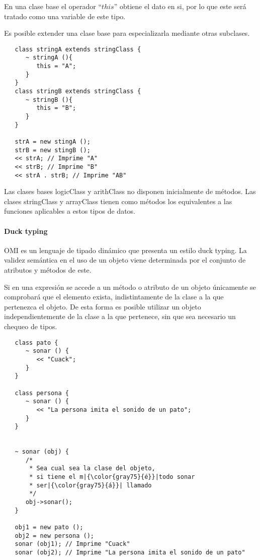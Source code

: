  En una clase base el operador ``$this$'' obtiene el dato en si, por lo que este será tratado como una variable
 de este tipo.
 
 Es posible extender una clase base para especializarla mediante otras subclases. \\
 
 \begin{lstlisting}
   class stringA extends stringClass {
      ~ stringA (){
         this = "A";
      }
   }
   class stringB extends stringClass {
      ~ stringB (){
         this = "B";
      }
   }

   strA = new stingA ();
   strB = new stingB ();
   << strA; // Imprime "A"
   << strB; // Imprime "B"
   << strA . strB; // Imprime "AB"
\end{lstlisting}

Las clases bases logicClass y arithClass no disponen inicialmente de métodos.
Las clases stringClass y arrayClass tienen como métodos los equivalentes 
a las funciones aplicables a estos tipos de datos.

\paragraph{Duck typing}

OMI es un lenguaje de tipado dinámico que presenta un estilo duck typing.
La validez semántica en el uso de un objeto viene determinada
por el conjunto de atributos y métodos de este. 

Si en una expresión se accede a un método o atributo de un objeto únicamente se
comprobará que el elemento exista, indistintamente de la clase a la que pertenezca 
el objeto. De esta forma es posible utilizar un objeto independientemente de 
la clase a la que pertenece, sin que sea necesario un chequeo de tipos. \\

\begin{lstlisting}
   class pato {
      ~ sonar () {
         << "Cuack";
      }
   }

   class persona {
      ~ sonar () {
         << "La persona imita el sonido de un pato";
      }
   }


   ~ sonar (obj) {
      /*
       * Sea cual sea la clase del objeto, 
       * si tiene el m|{\color{gray75}{é}}|todo sonar
       * ser|{\color{gray75}{á}}| llamado
       */
      obj->sonar();
   }

   obj1 = new pato ();
   obj2 = new persona ();
   sonar (obj1); // Imprime "Cuack"
   sonar (obj2); // Imprime "La persona imita el sonido de un pato"
\end{lstlisting}

